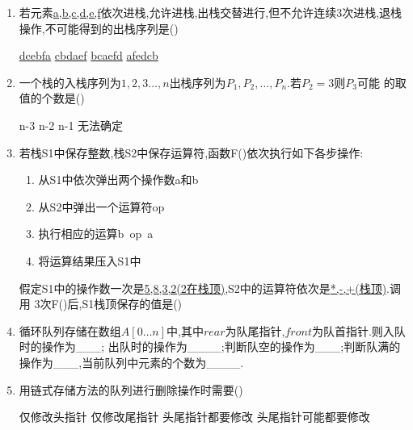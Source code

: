 \documentclass[12pt, a4paper, oneside, UTF8]{ctexbook}
\begin{document}
\begin{enumerate}
    \item \bl 若元素\underline{a,b,c,d,e,f}依次进栈,允许进栈,出栈交替进行,但不允许连续3次进栈,退栈
    操作,不可能得到的出栈序列是() 
    \begin{choices}
        \task \underline{dcebfa}
        \task \underline{cbdaef}
        \task \underline{bcaefd}
        \task \underline{afedcb} 
    \end{choices}



    \item \bl 一个栈的入栈序列为\underline{$1,2,3\ldots,n$}出栈序列为$P_1,P_2,\ldots,P_n$.若$P_2=3$则$P_3$可能 
    的取值的个数是() 
    \begin{choices}
        \task n-3
        \task n-2
        \task n-1
        \task 无法确定 
    \end{choices}


    \item \bl 若栈S1中保存整数,栈S2中保存运算符,函数F()依次执行如下各步操作: 
    \begin{enumerate}[label= (\arabic*)]
        \item 从S1中依次弹出两个操作数a和b
        \item 从S2中弹出一个运算符op
        \item 执行相应的运算b\ op\ a 
        \item 将运算结果压入S1中 
    \end{enumerate}
    假定S1中的操作数一次是\underline{5,8,3,2(2在栈顶)},S2中的运算符依次是\underline{*,-,+(栈顶)}.调用
    3次F()后,S1栈顶保存的值是() 
    \begin{choices}
    \end{choices}


    \item 循环队列存储在数组$A[0\ldots n]$中,其中$rear$为队尾指针,$front$为队首指针.则入队时的操作为\_\_\_;
    出队时的操作为\_\_\_\_;判断队空的操作为\_\_\_;判断队满的操作为\_\_\_,当前队列中元素的个数为\_\_\_\_. 




    \item 用链式存储方法的队列进行删除操作时需要() 
    \begin{choices}[2]
        \task 仅修改头指针
        \task 仅修改尾指针
        \task 头尾指针都要修改
        \task 头尾指针可能都要修改 
    \end{choices}




\end{enumerate}
\end{document}
